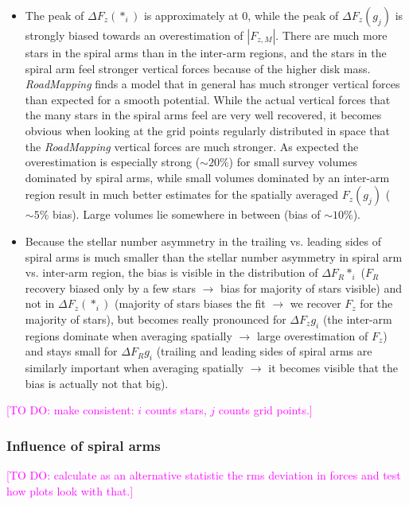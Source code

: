 \documentclass[iop,revtex4,numberedappendix,appendixfloats]{emulateapj}
\newcommand{\RM}{{\sl RoadMapping}}
\newcommand{\Wilma}[1]{\textcolor{Magenta}{#1}}
\begin{document}
\begin{itemize}
\item The peak of $\Delta F_z(*_i)$ is approximately at 0, while the peak of $\Delta F_z(g_j)$ is strongly biased towards an overestimation of $|F_{z,M}|$. There are much more stars in the spiral arms than in the inter-arm regions, and the stars in the spiral arm feel stronger vertical forces because of the higher disk mass. \RM{} finds a model that in general has much stronger vertical forces than expected for a smooth potential. While the actual vertical forces that the many stars in the spiral arms feel are very well recovered, it becomes obvious when looking at the grid points regularly distributed in space that the \RM{} vertical forces are much stronger. As expected the overestimation is especially strong ($\sim 20 \%$) for small survey volumes dominated by spiral arms, while small volumes dominated by an inter-arm region result in much better estimates for the spatially averaged $F_z(g_j)$ ($\sim5\%$ bias). Large volumes lie somewhere in between (bias of $\sim10\%$).

\item Because the stellar number asymmetry in the trailing vs. leading sides of spiral arms is much smaller than the stellar number asymmetry in spiral arm vs. inter-arm region, the bias is visible in the distribution of $\Delta F_R{*_i}$ ($F_R$ recovery biased only by a few stars $\longrightarrow$ bias for majority of stars visible) and not in $\Delta F_z(*_i)$ (majority of stars biases the fit $\longrightarrow$ we recover $F_z$ for the majority of stars), but becomes really pronounced for $\Delta F_z{g_i}$ (the inter-arm regions dominate when averaging spatially $\longrightarrow$ large overestimation of $F_z$) and stays small for $\Delta F_R{g_i}$ (trailing and leading sides of spiral arms are similarly important when averaging spatially $\longrightarrow$ it becomes visible that the bias is actually not that big).
\end{itemize}

\Wilma{[TO DO: make consistent: $i$ counts stars, $j$ counts grid points.]}


\subsubsection{Influence of spiral arms}

\Wilma{[TO DO: calculate as an alternative statistic the rms deviation in forces and test how plots look with that.]}
\end{document}
